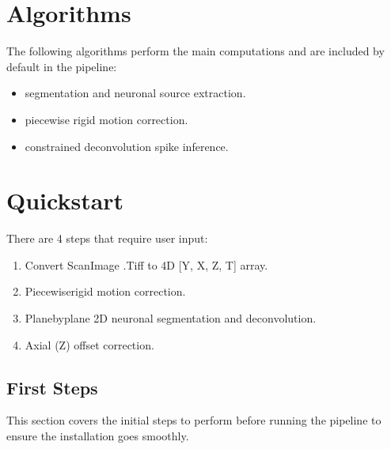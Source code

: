 \documentclass[letterpaper,10pt,english]{sphinxmanual}
\begin{document}
\chapter{Algorithms}
\label{\detokenize{index:algorithms}}
\sphinxAtStartPar
The following algorithms perform the main computations and are included by default in the pipeline:
\begin{itemize}
\item {} 
\sphinxAtStartPar
{} segmentation and neuronal source extraction.

\item {} 
\sphinxAtStartPar
{} piecewise rigid motion correction.

\item {} 
\sphinxAtStartPar
{} constrained deconvolution spike inference.

\end{itemize}


\chapter{Quickstart}
\label{\detokenize{index:quickstart}}
\sphinxAtStartPar
There are 4 steps that require user input:
\begin{enumerate}
%
\item {} 
\sphinxAtStartPar
Convert ScanImage .Tiff to 4D {[}Y, X, Z, T{]} array.

\item {} 
\sphinxAtStartPar
Piecewise\sphinxhyphen{}rigid motion correction.

\item {} 
\sphinxAtStartPar
Plane\sphinxhyphen{}by\sphinxhyphen{}plane 2D neuronal segmentation and deconvolution.

\item {} 
\sphinxAtStartPar
Axial (Z) offset correction.

\end{enumerate}

\sphinxstepscope


\section{First Steps}
\label{\detokenize{get_started/index:first-steps}}\label{\detokenize{get_started/index::doc}}
\sphinxAtStartPar
This section covers the initial steps to perform before running the pipeline to ensure the installation goes smoothly.
\end{document}
